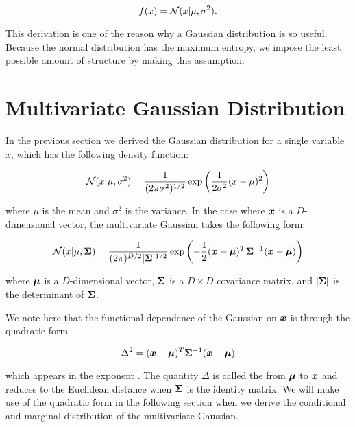 \begin{equation}
f(x) = {\mathcal{N}}(x | \mu, \sigma^2).
\end{equation}

This derivation is one of the reason why a Gaussian distribution is so useful.  Because the normal distribution has the maximum entropy, we impose the least possible amount of structure by making this assumption.

\section{Multivariate Gaussian Distribution}

In the previous section we derived the Gaussian distribution for a single variable $x$, which has the following density function: 

\begin{equation}
{\mathcal{N}}(x | \mu, \sigma^2) = \frac{1}{(2 \pi \sigma^2)^{1/2}} \exp \left( \frac{1}{2\sigma^2} (x - \mu)^2 \right) \label{eq:single-gaussian}
\end{equation}

where $\mu$ is the mean and $\sigma^2$ is the variance. In the case where ${\bm{x}}$ is a $D$-dimensional vector, the multivariate Gaussian takes the following form:

\begin{equation}
{\mathcal{N}}(x | \mu, {\bm{\Sigma}}) = \frac{1}{(2 \pi)^{D/2} |{\bm{\Sigma}}|^{1/2}} \exp \left( -\frac{1}{2} ({\bm{x}} - {\bm{\mu}})^T {\bm{\Sigma}}^{-1} ({\bm{x}} - {\bm{\mu}}) \right) \label{eq:multi-gaussian}
\end{equation}

where ${\bm{\mu}}$ is a $D$-dimensional vector, ${\bm{\Sigma}}$ is a $D \times D$ covariance matrix, and $|{\bm{\Sigma}}|$ is the determinant of ${\bm{\Sigma}}$.

We note here that the functional dependence of the Gaussian on ${\bm{x}}$ is through the quadratic form

\begin{equation}
\Delta^2 = ({\bm{x}} - {\bm{\mu}})^T {\bm{\Sigma}}^{-1} ({\bm{x}} - {\bm{\mu}})
\end{equation}

which appears in the exponent \citep{bishop2016pattern} . The quantity $\Delta$ is called the  from ${\bm{\mu}}$ to ${\bm{x}}$ and reduces to the Euclidean distance when ${\bm{\Sigma}}$ is the identity matrix. We will make use of the quadratic form in the following section when we derive the conditional and marginal distribution of the multivariate Gaussian.

